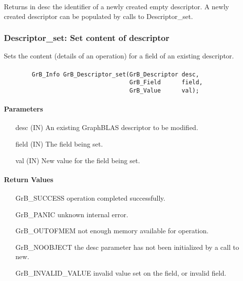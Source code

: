 Returns in {\sf desc} the identifier of a newly created empty descriptor.
A newly created descriptor can be populated by calls to {\sf Descriptor\_set}.


\subsubsection{{\sf Descriptor\_set}: Set content of descriptor}

Sets the content (details of an operation) for a field of an existing
descriptor.

\paragraph{\syntax}

\begin{verbatim}
        GrB_Info GrB_Descriptor_set(GrB_Descriptor desc,
                                    GrB_Field      field,
                                    GrB_Value      val);
\end{verbatim}

\paragraph{Parameters}

\begin{itemize}[leftmargin=1.1in]
    \item[{\sf desc}]  ({\sf IN}) An existing GraphBLAS descriptor to be modified.
    \item[{\sf field}] ({\sf IN}) The field being set.
    \item[{\sf val}]   ({\sf IN}) New value for the field being set.
\end{itemize}

\paragraph{Return Values}

\begin{itemize}[leftmargin=2.1in]
\item[{\sf GrB\_SUCCESS}]           operation completed successfully.
\item[{\sf GrB\_PANIC}]             unknown internal error.
\item[{\sf GrB\_OUTOFMEM}]          not enough memory available for operation.
\item[{\sf GrB\_NOOBJECT}]          the {\sf desc} parameter has not been
                                    initialized by a call to {\sf new}.
\item[{\sf GrB\_INVALID\_VALUE}]    invalid value set on the field, or invalid field.
\end{itemize}

